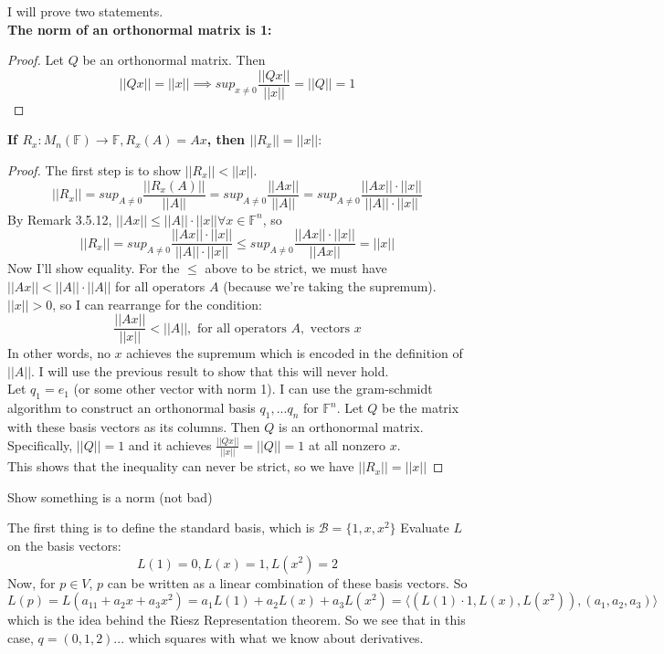 \documentclass[12pt]{article}
\newenvironment{problem}[2][Problem]{\begin{trivlist}
\item[\hskip \labelsep {\bfseries #1}\hskip \labelsep {\bfseries #2.}]}{\end{trivlist}}
\theoremstyle{definition}
\theoremstyle{definition}
\theoremstyle{definition}
\theoremstyle{definition}
\begin{document}
\begin{problem}{3.29}
I will prove two statements. \\

\textbf{The norm of an orthonormal matrix is 1:}
\begin{proof}
Let $Q$ be an orthonormal matrix. Then 
$$ ||Qx|| = ||x|| \implies sup_{x\neq 0} \frac{||Qx||}{||x||} = ||Q|| = 1 $$
\end{proof}

\textbf{If $R_x : M_n(\mathbb{F}) \to  \mathbb{F} , R_x(A) = Ax$, then $||R_x||=||x||$}:
\begin{proof}
The first step is to show $||R_x|| < ||x||$. $$||R_x|| = sup_{A\neq 0} \frac{||R_x(A)||}{||A||} = sup_{A\neq 0} \frac{||Ax||}{||A||} = sup_{A\neq 0} \frac{||Ax||\cdot ||x||}{||A||\cdot ||x||}$$
By Remark 3.5.12, $||Ax|| \leq ||A|| \cdot ||x|| \forall x \in \mathbb{F}^n$, so $$||R_x|| =sup_{A \neq 0} \frac{||Ax||\cdot ||x||}{||A||\cdot ||x||} \leq sup_{A \neq 0}\frac{||Ax|| \cdot ||x||}{||Ax||} = ||x|| $$
Now I'll show equality. For the $\leq$ above to be strict, we must have $ ||Ax|| < ||A||\cdot||A|| $ for all operators $A$ (because we're taking the supremum). $||x|| > 0$, so I can rearrange for the condition: 
$$ \frac{||Ax||}{||x||} < ||A||, \text{ for all operators } A, \text{ vectors } x $$
In other words, no $x$ achieves the supremum which is encoded in the definition of $||A||$. I will use the previous result to show that this will never hold. \\
Let $q_1 = e_1$ (or some other vector with norm 1). I can use the gram-schmidt algorithm to construct an orthonormal basis $q_1, ... q_n$ for $\mathbb{F}^n$. Let $Q$ be the matrix with these basis vectors as its columns. Then $Q$ is an orthonormal matrix. Specifically, $||Q|| = 1$ and it achieves $\frac{||Qx||}{||x||} = ||Q|| = 1$ at all nonzero $x$. \\
This shows that the inequality can never be strict, so we have $||R_x|| = ||x||$
\end{proof} 
\end{problem}

\begin{problem}{3.30}
Show something is a norm (not bad)
\end{problem}

\begin{problem}{3.37}
The first thing is to define the standard basis, which is $\mathcal{B} = \{1, x, x^2\}$ Evaluate $L$ on the basis vectors: 
$$L(1) = 0, L(x) = 1, L(x^2) = 2$$
Now, for $p \in V$, $p$ can be written as a linear combination of these basis vectors. So 
$$ L(p) = L(a_11 + a_2x + a_3x^2) = a_1L(1) +a_2 L(x) + a_3 L(x^2) = \langle (L(1)\cdot 1, L(x), L(x^2)) , (a_1, a_2, a_3) \rangle$$
which is the idea behind the Riesz Representation theorem. So we see that in this case, $q = (0, 1, 2)$... which squares with  what we know about derivatives.
\end{problem}
\end{document}
